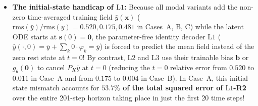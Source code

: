 \begin{itemize}[leftmargin=2em]
  \item \textbf{The initial-state handicap of $\mathrm{L1}$:} Because all modal variants add the non-zero time-averaged training field $\bar{y}(\mathbf{x})$ ($\mathrm{rms}(\bar{y})/\mathrm{rms}(y) = 0.520, 0.175, 0.481$ in Cases~A, B, C) while the latent ODE starts at $\mathbf{s}(0) = \mathbf{0}$, the parameter-free identity decoder $\mathrm{L1}$ ($\hat{y}(\cdot,0) = \bar{y} + \sum_k 0\cdot\varphi_k = \bar{y}$) is forced to predict the mean field instead of the zero rest state at $t = 0$! By contrast, $\mathrm{L2}$ and $\mathrm{L3}$ use their trainable bias $\mathbf{b}$ or $g_\theta(\mathbf{0})$ to cancel $P_K\bar{y}$ at $t=0$ (reducing the $t=0$ relative error from $0.520$ to $0.011$ in Case~A and from $0.175$ to $0.004$ in Case~B). In Case~A, this initial-state mismatch accounts for \textbf{$53.7\%$ of the total squared error of $\mathrm{L1}$-R2} over the entire 201-step horizon taking place in just the first 20 time steps!
\end{itemize}
